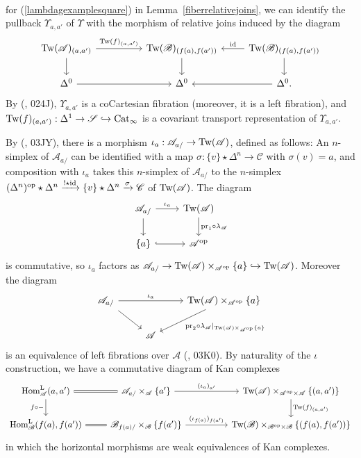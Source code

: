 \documentclass{tac}
\newcommand{\s}[1]{\mathscr{#1}}
\newcommand{\tx}[1]{\textnormal{#1}}
\begin{document}
\begin{rmk}
\[\begin{tikzcd}
\end{tikzcd}\]
for (\ref{lambdagexamplesquare}) in Lemma~\ref{fiberrelativejoins}, we can identify the pullback $\Upsilon_{a,a'}$ of $\Upsilon$ with the morphism of relative joins induced by the diagram
\[\begin{tikzcd}
\tx{Tw}(\s{A})_{(a,a')} \arrow[]{rr}{\tx{Tw}(f)_{(a,a')}} \arrow[]{d} & & \tx{Tw}(\s{B})_{ (f(a),f(a'))} \arrow[]{d} &  \tx{Tw}(\s{B})_{ (f(a),f(a'))} \arrow[]{l}[swap]{\tx{id}} \arrow[]{d} \\
\Delta^0 \arrow[]{rr} & & \Delta^0 & \Delta^0 .\arrow[]{l}
\end{tikzcd}\]
By (\cite{kerodon}, 024J), $\Upsilon_{a,a'}$ is a coCartesian fibration (moreover, it is a left fibration), and $\tx{Tw}(f)_{(a,a')} : \Delta^1 \to \s{S} \hookrightarrow \tx{Cat}_\infty$ is a covariant transport representation of $\Upsilon_{a,a'}$.

By (\cite{kerodon}, 03JY), there is a morphism $\iota_{a} : \s{A}_{a/} \to \tx{Tw}(\s{A})$, defined as follows: An $n$-simplex of $\s{A}_{a/}$ can be identified with a map $\sigma : \{ v \} \star \Delta^n \to \s{C}$ with $\sigma (v) =a$, and composition with $\iota_{a}$ takes this $n$-simplex of $\s{A}_{a/}$ to the $n$-simplex $(\Delta^n )^{\tx{op}} \star \Delta^n \xrightarrow{! \star \tx{id}} \{ v \} \star \Delta^n \xrightarrow{\sigma} \s{C}$ of $\tx{Tw}(\s{A})$.  The diagram
\[\begin{tikzcd}
\s{A}_{a/} \arrow[]{r}{\iota_{a}} \arrow[]{d} & \tx{Tw}(\s{A})\arrow[]{d}{\tx{pr}_1 \circ \lambda_{\s{A}}} \\
\{a\} \arrow[hook]{r} & \s{A}^\tx{op}
\end{tikzcd}\]
is commutative, so $\iota_a$ factors as $\s{A}_{a/} \to  \tx{Tw}(\s{A}) \times_{\s{A}^{\tx{op}}} \{a \} \hookrightarrow \tx{Tw}(\s{A})$.  Moreover the diagram
\[\begin{tikzcd}
\s{A}_{a/} \arrow[]{rr}{\iota_{a}} \arrow[]{dr} & &  \tx{Tw}(\s{A}) \times_{\s{A}^{\tx{op}}} \{a \} \arrow[]{dl}{\tx{pr}_2 \circ \lambda_{\s{A}} |_{\tx{Tw}(\s{A}) \times_{\s{A}^{\tx{op}}} \{a \}} } \\
& \s{A} &
\end{tikzcd}\]
is an equivalence of left fibrations over $\s{A}$ (\cite{kerodon}, 03K0).  By naturality of the $\iota$ construction, we have a commutative diagram of Kan complexes
\[\begin{tikzcd}
\tx{Hom}_{\s{A}}^\tx{L} (a,a' ) \arrow[]{d}[swap]{f\circ -} \arrow[equal]{r} & \s{A}_{a/} \times_{\s{A}} \{ a' \} \arrow[]{rr}{(\iota_a )_{a'}} & & \tx{Tw}(\s{A})\times_{\s{A}^\tx{op} \times \s{A}} \{ (a,a') \} \arrow[]{d}{\tx{Tw}(f)_{(a,a')}} \\
\tx{Hom}_{\s{B}}^\tx{L} (f(a), f(a') ) \arrow[equal]{r} & \s{B}_{f(a)/} \times_{\s{B}} \{ f(a') \} \arrow[]{rr}{(\iota_{f(a)} )_{f(a')}} & &  \tx{Tw}(\s{B})\times_{\s{B}^\tx{op} \times \s{B}} \{ (f(a),f(a')) \}
\end{tikzcd}\]
in which the horizontal morphisms are weak equivalences of Kan complexes.
\end{rmk}
\end{document}
